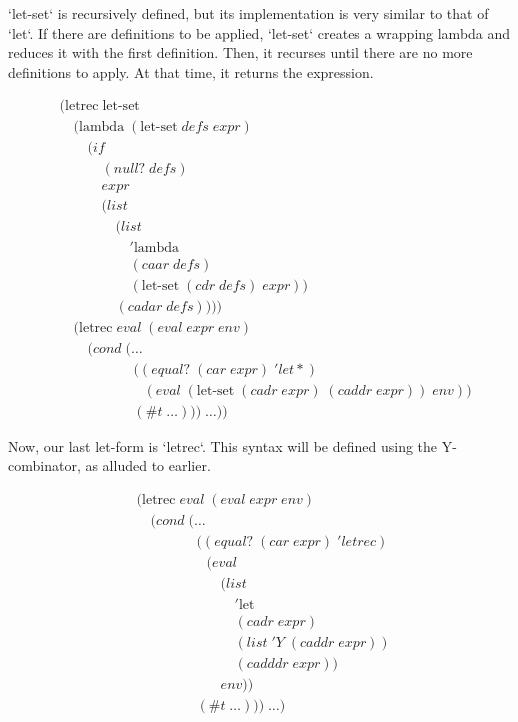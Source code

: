 `let-set` is recursively defined, but its implementation is very similar to
that of `let`. If there are definitions to be applied, `let-set` creates a
wrapping lambda and reduces it with the first definition. Then, it recurses
until there are no more definitions to apply. At that time, it returns the
expression.

\begin{align*}
& (\text{letrec} \; \text{let-set} \; 
\\& \quad (\text{lambda} \; (\text{let-set} \; defs \; expr)
\\& \qquad (if
\\& \qquad \quad (null? \; defs)
\\& \qquad \quad expr
\\& \qquad \quad (list \; 
\\& \qquad \qquad (list \; 
\\& \qquad \qquad \quad '\text{lambda} \; 
\\& \qquad \qquad \quad (caar \; defs) \; 
\\& \qquad \qquad \quad (\text{let-set} \; (cdr \; defs) \; expr)) \; 
\\& \qquad \qquad (cadar \; defs))))
\\& \quad (\text{letrec} \; eval \; (eval \; expr \; env)
\\& \qquad (cond \; (\dots
\\& \qquad \qquad \quad \; ((equal? \; (car \; expr) \; 'let*) \; 
\\& \qquad \qquad \qquad (eval \; (\text{let-set} \; (cadr \; expr) \; (caddr \; expr)) \; env))
\\& \qquad \qquad \quad \; (\#t \; \dots))) \; \dots))
\end{align*}

Now, our last let-form is `letrec`. This syntax will be defined using the Y-
combinator, as alluded to earlier.

\begin{align*}
& (\text{letrec} \; eval \; (eval \; expr \; env)
\\& \quad (cond \; (\dots
\\& \qquad \qquad \; ((equal? \; (car \; expr) \; 'letrec)
\\& \qquad \qquad \quad (eval
\\& \qquad \qquad \qquad (list \; 
\\& \qquad \qquad \qquad \quad '\text{let} \; 
\\& \qquad \qquad \qquad \quad (cadr \; expr) \; 
\\& \qquad \qquad \qquad \quad (list \; 'Y \; (caddr \; expr)) \; 
\\& \qquad \qquad \qquad \quad (cadddr \; expr))
\\& \qquad \qquad \qquad env))
\\& \qquad \qquad \; (\#t \; \dots))) \; \dots)
\end{align*}

